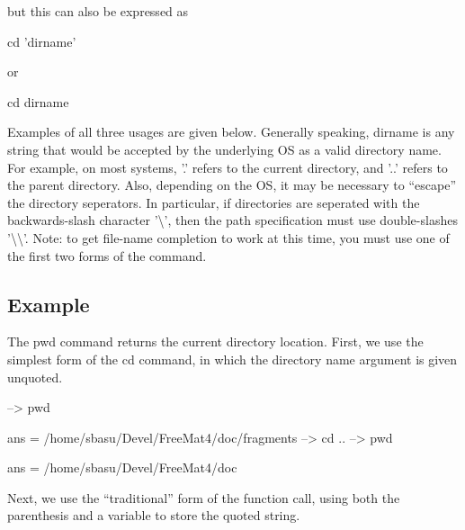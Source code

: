  but this can also be expressed as \begin{DoxyVerb}  cd 'dirname'
\end{DoxyVerb}
 or \begin{DoxyVerb}  cd dirname
\end{DoxyVerb}
 Examples of all three usages are given below. Generally speaking, {\ttfamily dirname} is any string that would be accepted by the underlying O\-S as a valid directory name. For example, on most systems, {\ttfamily '.'} refers to the current directory, and {\ttfamily '..'} refers to the parent directory. Also, depending on the O\-S, it may be necessary to ``escape'' the directory seperators. In particular, if directories are seperated with the backwards-\/slash character {\ttfamily '\textbackslash{}'}, then the path specification must use double-\/slashes {\ttfamily '\textbackslash{}\textbackslash{}'}. Note\-: to get file-\/name completion to work at this time, you must use one of the first two forms of the command.\hypertarget{variables_struct_Example}{}\subsection{Example}\label{variables_struct_Example}
The {\ttfamily pwd} command returns the current directory location. First, we use the simplest form of the {\ttfamily cd} command, in which the directory name argument is given unquoted.


\begin{DoxyVerbInclude}
--> pwd

ans = 
/home/sbasu/Devel/FreeMat4/doc/fragments
--> cd ..
--> pwd

ans = 
/home/sbasu/Devel/FreeMat4/doc
\end{DoxyVerbInclude}


Next, we use the ``traditional'' form of the function call, using both the parenthesis and a variable to store the quoted string.


